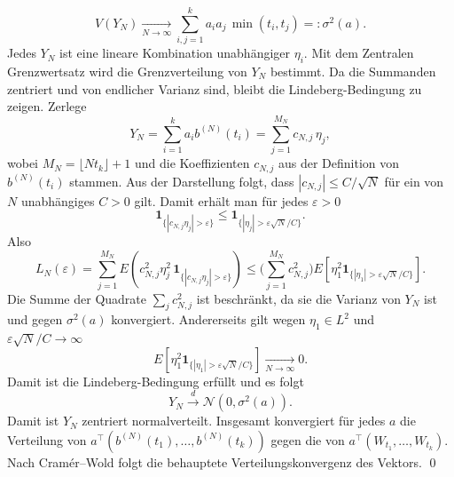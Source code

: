 \begin{satz}
$$
V(Y_N)\xrightarrow[N\to\infty]{}\sum_{i,j=1}^k a_i a_j\,\min(t_i,t_j)=:\sigma^2(a).
$$
Jedes $Y_N$ ist eine lineare Kombination unabhängiger $\eta_i$. Mit dem Zentralen Grenzwertsatz wird die Grenzverteilung von $Y_N$ bestimmt.
Da die Summanden zentriert und von endlicher Varianz sind, bleibt die Lindeberg-Bedingung zu zeigen. Zerlege
$$
Y_N=\sum_{i=1}^k a_i b^{(N)}(t_i)=\sum_{j=1}^{M_N} c_{N,j}\,\eta_j,
$$
wobei $M_N=\lfloor Nt_k\rfloor+1$ und die Koeffizienten $c_{N,j}$ aus der Definition von $b^{(N)}(t_i)$ stammen.
Aus der Darstellung folgt, dass $|c_{N,j}|\le C/\sqrt N$ für ein von $N$ unabhängiges $C>0$ gilt.
Damit erhält man für jedes $\varepsilon>0$
$$
\mathbf 1_{\{|c_{N,j}\eta_j|>\varepsilon\}}
\le \mathbf 1_{\{|\eta_j|>\varepsilon\sqrt N/C\}}.
$$
Also
$$
L_N(\varepsilon) = \sum_{j=1}^{M_N} E \left (c_{N,j}^2\eta_j^2\,\mathbf 1_{\{|c_{N,j}\eta_j|>\varepsilon\}} \right )
\le \Big(\sum_{j=1}^{M_N} c_{N,j}^2 \Big) E \left [ \eta_1^2\mathbf 1_{\{|\eta_1|>\varepsilon\sqrt N/C\}} \right ].
$$
Die Summe der Quadrate $\sum_j c_{N,j}^2$ ist beschränkt, da sie die Varianz von $Y_N$ ist und gegen
$\sigma^2(a)$ konvergiert. Andererseits gilt wegen $\eta_1\in L^2$ und $\varepsilon\sqrt N/C \to \infty$
$$
E \left [ \eta_1^2\mathbf 1_{\{|\eta_1|>\varepsilon\sqrt N/C\}} \right ] \xrightarrow[N\to\infty]{}0.
$$
Damit ist die Lindeberg-Bedingung erfüllt und es folgt
$$
Y_N \xrightarrow{d} \mathcal N(0,\sigma^2(a)).
$$
Damit ist $Y_N$ zentriert normalverteilt. Insgesamt konvergiert für jedes $a$ die Verteilung von $a^\top(b^{(N)}(t_1),\dots,b^{(N)}(t_k))$ gegen die von $a^\top(W_{t_1},\dots,W_{t_k})$.
Nach Cramér–Wold folgt die behauptete Verteilungskonvergenz des Vektors. \qed
\end{satz}

